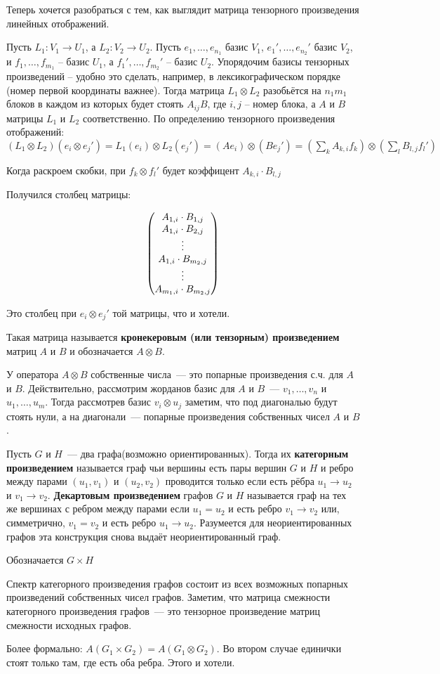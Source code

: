 Теперь хочется разобраться с тем, как выглядит матрица тензорного произведения линейных отображений.

\lm
	Пусть $L_1 \colon V_1 \to U_1$, а $L_2 \colon V_2 \to U_2$. Пусть $e_1,\dots, e_{n_1}$ базис $V_1$,  $e_1',\dots, e_{n_2}'$ базис $V_2$,  и $f_1,\dots, f_{m_1}$ -- базис $U_1$, а $f_1',\dots, f_{m_2}'$ -- базис $U_2$. 
	Упорядочим базисы тензорных произведений -- удобно это сделать, например, в лексикографическом порядке (номер первой координаты важнее).
	Тогда матрица  $L_1\otimes L_2$  разобьётся на $n_1m_1$ блоков в каждом из которых будет стоять $ A_{ij} B$, где $i,j$ -- номер блока, а $A$ и $B$ матрицы $L_1$ и $L_2$ соответственно.
	\proof
		По определению тензорного произведения отображений: $(L_1\otimes L_2)(e_i\otimes e_j') = L_1(e_i)\otimes L_2(e_j') = (Ae_i)\otimes (Be_j') = (\sum\limits_{k} A_{k, i} f_k)\otimes(\sum\limits_{l} B_{l, j} f_l')$

		Когда раскроем скобки, при $f_k\otimes f_l'$ будет коэффицент $A_{k, i}\cdot B_{l, j}$

		Получился столбец матрицы:

		$$\begin{pmatrix}
		A_{1, i}\cdot B_{1, j}\\
		A_{1, i}\cdot B_{2, j}\\
		\vdots\\
		A_{1, i}\cdot B_{m_2, j}\\
		\vdots\\
		A_{m_1, i}\cdot B_{m_2, j}
		\end{pmatrix}$$

		Это столбец при $e_i\otimes e_j'$ той матрицы, что и хотели.
	\endproof
\elm

\dfn
	Такая матрица называется {\bf кронекеровым (или тензорным) произведением} матриц $A$ и $B$ и обозначается $A\otimes B$.
\edfn

\lm
	У оператора $A\otimes B$ собственные числа~--- это попарные произведения с.ч. для $A$ и $B$. 
	\proof 
		Действительно, рассмотрим жорданов базис для $A$ и $B$~--- $v_1,\dots,v_n$ и $u_1,\dots, u_m$. Тогда рассмотрев базис $v_i\otimes u_j$ заметим, что под диагональю будут стоять нули, а на диагонали~--- попарные произведения собственных чисел $A$ и $B$.
	\endproof
\elm

\dfn 
	Пусть $G$ и $H$~--- два графа(возможно ориентированных). Тогда их {\bf категорным произведением} называется граф чьи вершины есть пары вершин $G$ и $H$ и ребро между парами $(u_1,v_1)$ и $(u_2,v_2)$ проводится только если есть рёбра $u_1 \to u_2$ и $v_1 \to v_2$. {\bf Декартовым произведением} графов $G$ и $H$ называется граф на тех же вершинах с ребром между парами если $u_1=u_2$ и есть ребро $v_1\to v_2$ или, симметрично, $v_1=v_2$ и есть ребро $u_1 \to u_2$. Разумеется для неориентированных графов эта конструкция снова выдаёт неориентированный граф.

	Обозначается $G\times H$
\edfn


\lm
	Спектр категорного произведения графов состоит из всех возможных попарных произведений собственных чисел графов.
	\proof 
		Заметим, что матрица смежности категорного произведения графов~--- это тензорное произведение матриц смежности исходных графов.

		Более формально: $A(G_1\times G_2) = A(G_1\otimes G_2)$. Во втором случае единички стоят только там, где есть оба ребра. Этого и хотели.
	\endproof
\elm
